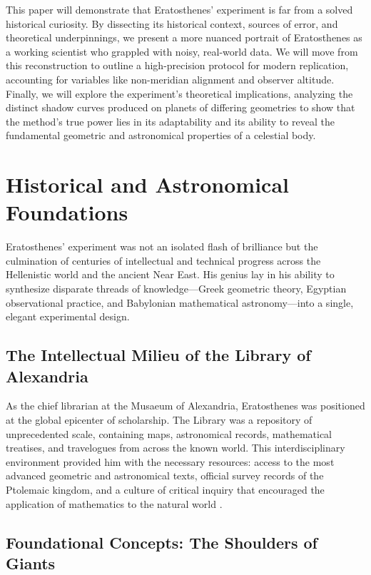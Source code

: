 \documentclass[11pt]{article}
\begin{document}
This paper will demonstrate that Eratosthenes' experiment is far from a solved historical curiosity. By dissecting its historical context, sources of error, and theoretical underpinnings, we present a more nuanced portrait of Eratosthenes as a working scientist who grappled with noisy, real-world data. We will move from this reconstruction to outline a high-precision protocol for modern replication, accounting for variables like non-meridian alignment and observer altitude. Finally, we will explore the experiment’s theoretical implications, analyzing the distinct shadow curves produced on planets of differing geometries to show that the method’s true power lies in its adaptability and its ability to reveal the fundamental geometric and astronomical properties of a celestial body.

\section{Historical and Astronomical Foundations}

Eratosthenes' experiment was not an isolated flash of brilliance but the culmination of centuries of intellectual and technical progress across the Hellenistic world and the ancient Near East. His genius lay in his ability to synthesize disparate threads of knowledge—Greek geometric theory, Egyptian observational practice, and Babylonian mathematical astronomy—into a single, elegant experimental design.

\subsection{The Intellectual Milieu of the Library of Alexandria}

As the chief librarian at the Musaeum of Alexandria, Eratosthenes was positioned at the global epicenter of scholarship. The Library was a repository of unprecedented scale, containing maps, astronomical records, mathematical treatises, and travelogues from across the known world. This interdisciplinary environment provided him with the necessary resources: access to the most advanced geometric and astronomical texts, official survey records of the Ptolemaic kingdom, and a culture of critical inquiry that encouraged the application of mathematics to the natural world \cite{MacLeod2004}.

\subsection{Foundational Concepts: The Shoulders of Giants}
\end{document}
